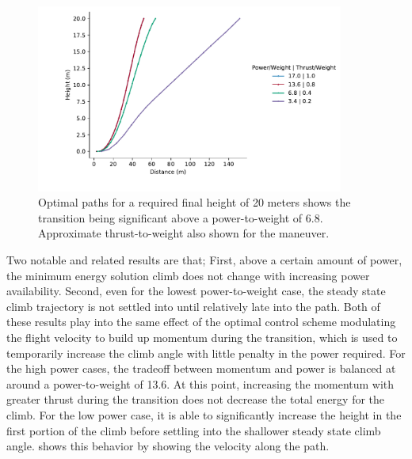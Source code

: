 \documentclass[10pt,english]{article}
\begin{document}
\begin{figure}[H]
\centering
\includegraphics[trim={.0cm 0.5cm .0cm 0cm},clip,width=0.9\textwidth]{pn_pd}
\vspace{-5pt}
\caption{Optimal paths for a required final height of 20 meters shows the transition being significant above a power-to-weight of 6.8. Approximate thrust-to-weight also shown for the maneuver.}
\label{f:dyanmic_path}
\end{figure}

Two notable and related results are that; First, above a certain amount of power, the minimum energy solution climb does not change with increasing power availability. Second, even for the lowest power-to-weight case, the steady state climb trajectory is not settled into until relatively late into the path.  Both of these results play into the same effect of the optimal control scheme modulating the flight velocity to build up momentum during the transition, which is used to temporarily increase the climb angle with little penalty in the power required.  For the high power cases, the tradeoff between momentum and power is balanced at around a power-to-weight of 13.6.  At this point, increasing the momentum with greater thrust during the transition does not decrease the total energy for the climb.  For the low power case, it is able to significantly increase the height in the first portion of the climb before settling into the shallower steady state climb angle.   shows this behavior by showing the velocity along the path.
\end{document}
